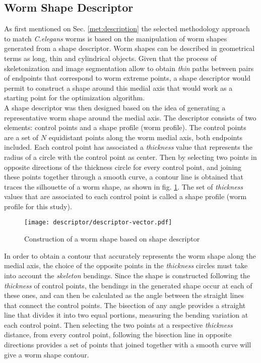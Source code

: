 \subsection{Worm Shape Descriptor}
\label{sec:metshapedescriptor}

As first mentioned on Sec. \ref{met:description} the selected methodology approach 
to match \emph{C.elegans} worms is based on the manipulation of 
worm shapes generated from a shape descriptor.
Worm shapes can be described in geometrical terms as long, thin and cylindrical 
objects. Given that the process of skeletonization and image segmentation allow
to obtain \emph{thin} paths between pairs of endpoints that correspond to worm 
extreme points, a shape descriptor would permit to construct a shape around this
medial axis that would work as a starting point for the optimization algorithm. \\

A shape descriptor was then designed based on the idea of generating a representative
worm shape around the medial axis. The descriptor consists of two 
elements: control points and a shape profile (worm profile). The control points are
a set of $N$ equidistant points along the worm medial axis, both endpoints included.
Each control point has associated a \emph{thickness} value that represents the
radius of a circle with the control point as center. Then by selecting two points
in opposite directions of the thickness circle for every control point, and joining
these points together through a smooth curve, a contour line is obtained that traces
the silhouette of a worm shape, as shown in fig. \ref{fig:descriptor}. 
The set of \emph{thickness} values that are associated to each control point
is called a shape profile (worm profile for this study).

\begin{figure}[h t b p ! H]
 \centering
   \texttt{[image: descriptor/descriptor-vector.pdf]}
 \caption{Construction of a worm shape based on shape descriptor}
 \label{fig:descriptor}
\end{figure}

In order to obtain a contour that accurately represents the worm shape along the 
medial axis, the choice of the opposite points in the \emph{thickness} circles 
must take into account the \emph{skeleton} bendings.
Since the shape is constructed following the \emph{thickness} of control points,
the bendings in the generated shape occur at each of these ones, and can then be 
calculated as the angle between the straight lines that connect the control points.
The bisection of any angle provides a straight line that divides it
into two equal portions, measuring the bending variation at each control point.
Then selecting the two points at a respective \emph{thickness} distance, from every control
point, following the bisection line in opposite directions provides a set of points
that joined together with a smooth curve will give a worm shape contour.\\

